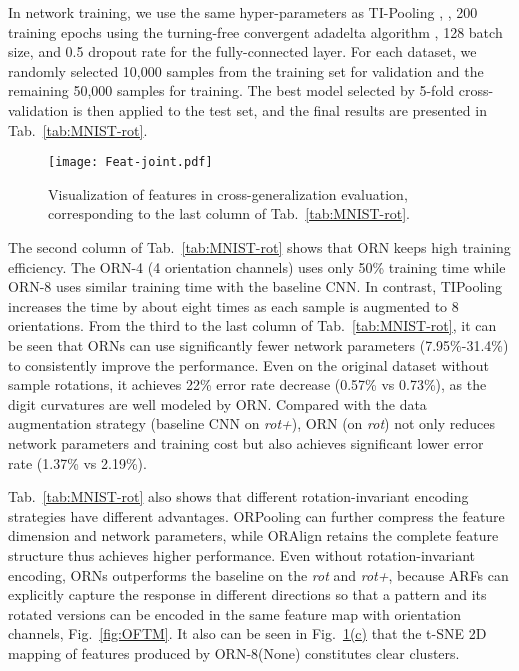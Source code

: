 \documentclass[10pt,twocolumn,letterpaper]{article}
\begin{document}
    In network training, we use the same hyper-parameters as TI-Pooling \cite{Laptev2016}, \ie, 200 training epochs using the turning-free convergent adadelta algorithm \cite{Zeiler2012}, 128 batch size, and 0.5 dropout rate for the fully-connected layer. For each dataset, we randomly selected 10,000 samples from the training set for validation and the remaining 50,000 samples for training. The best model selected by 5-fold cross-validation is then applied to the test set, and the final results are {presented} in Tab.~\ref{tab:MNIST-rot}.

    \begin{figure}
        \centering
        \texttt{[image: Feat-joint.pdf]}
        \caption{Visualization of features in cross-generalization evaluation, corresponding to the last column of Tab.~\ref{tab:MNIST-rot}.}
    \label{fig:FeatureVis}
    \vspace{-0.8em}
    \end{figure}

    The second column of Tab.~\ref{tab:MNIST-rot} shows that ORN keeps high training efficiency. The ORN-4 (4 orientation channels) uses only 50\% training time while ORN-8 uses similar training time with the baseline CNN. In {contrast},
    TIPooling increases the time by about eight times as each sample is augmented to 8 orientations. From the third to the last column of Tab.~\ref{tab:MNIST-rot}, it can be seen that ORNs can use significantly fewer network parameters (7.95\%-31.4\%) to consistently improve the performance. Even on the original dataset without sample rotations, it achieves 22\% error rate decrease (0.57\% vs 0.73\%), as the digit curvatures are well modeled by ORN. Compared with the data augmentation strategy (baseline CNN on \textit{rot+}), ORN (on \textit{rot}) not only reduces network parameters and training cost but also achieves significant lower error rate (1.37\% vs 2.19\%).

    Tab.~\ref{tab:MNIST-rot} also shows that different rotation-invariant encoding strategies have different advantages. ORPooling can further compress the feature dimension and network parameters, while ORAlign retains the complete feature structure thus achieves higher performance. Even without rotation-invariant encoding, ORNs outperforms the baseline on the \textit{rot} and \textit{rot+}, because ARFs can explicitly capture the response in different directions so that a pattern and its rotated versions can be encoded in the same feature map with orientation channels, Fig.~\ref{fig:OFTM}.
    It also can be seen in Fig.~\hyperref[fig:FeatureVis]{\ref*{fig:FeatureVis}(c)} that the t-SNE \cite{Maaten2008} 2D mapping of features produced by ORN-8(None) constitutes clear clusters.
\end{document}
